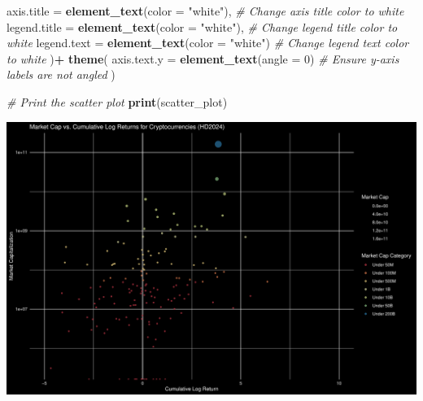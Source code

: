 \documentclass[
]{article}
\newenvironment{Shaded}{\begin{snugshade}}{\end{snugshade}}
\newcommand{\AttributeTok}[1]{\textcolor[rgb]{0.13,0.29,0.53}{#1}}
\newcommand{\CommentTok}[1]{\textcolor[rgb]{0.56,0.35,0.01}{\textit{#1}}}
\newcommand{\DecValTok}[1]{\textcolor[rgb]{0.00,0.00,0.81}{#1}}
\newcommand{\FunctionTok}[1]{\textcolor[rgb]{0.13,0.29,0.53}{\textbf{#1}}}
\newcommand{\NormalTok}[1]{#1}
\newcommand{\SpecialCharTok}[1]{\textcolor[rgb]{0.81,0.36,0.00}{\textbf{#1}}}
\newcommand{\StringTok}[1]{\textcolor[rgb]{0.31,0.60,0.02}{#1}}
\begin{document}
\begin{Shaded}
\begin{Highlighting}[]
    \AttributeTok{axis.title =} \FunctionTok{element\_text}\NormalTok{(}\AttributeTok{color =} \StringTok{"white"}\NormalTok{), }\CommentTok{\# Change axis title color to white}
    \AttributeTok{legend.title =} \FunctionTok{element\_text}\NormalTok{(}\AttributeTok{color =} \StringTok{"white"}\NormalTok{), }\CommentTok{\# Change legend title color to white}
    \AttributeTok{legend.text =} \FunctionTok{element\_text}\NormalTok{(}\AttributeTok{color =} \StringTok{"white"}\NormalTok{) }\CommentTok{\# Change legend text color to white}
\NormalTok{  )}\SpecialCharTok{+}
  \FunctionTok{theme}\NormalTok{(}
    \AttributeTok{axis.text.y =} \FunctionTok{element\_text}\NormalTok{(}\AttributeTok{angle =} \DecValTok{0}\NormalTok{)  }\CommentTok{\# Ensure y{-}axis labels are not angled}
\NormalTok{  )}

\CommentTok{\# Print the scatter plot}
\FunctionTok{print}\NormalTok{(scatter\_plot)}
\end{Highlighting}
\end{Shaded}

\includegraphics{Crypto_ETL_files/figure-latex/unnamed-chunk-12-1.pdf}
\end{document}

